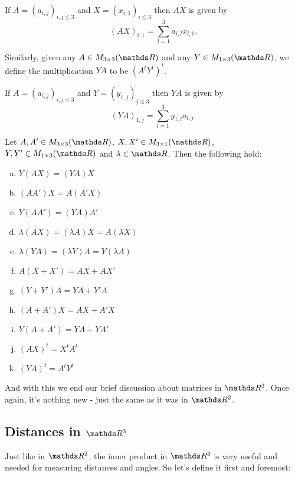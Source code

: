 \begin{lemma}
	If $A=(a_{i,j})_{i,j\leq 3}$ and $X=(x_{i,1})_{i\leq 3}$ then $AX$ is given by
	\[(AX)_{i,1}=\sum_{l=1}^3a_{i,l}x_{l,1}.\]
\end{lemma}

\begin{df}
	Similarly, given any $A\in M_{3\times 3}(\R)$ and any $Y\in M_{1\times 3}(\R)$, we define the multiplication $YA$ to be $(A^tY^t)^t$.
\end{df}

\begin{lemma}
	If $A=(a_{i,j})_{i,j\leq 3}$ and $Y=(y_{1,j})_{j\leq 3}$ then $YA$ is given by
\[(YA)_{1,j}=\sum_{l=1}^3y_{1,l}a_{l,j}.\]
\end{lemma}

\begin{prop}
	Let $A,A' \in M_{3\times 3}(\R)$, $X,X'\in M_{3\times 1}(\R)$, $Y,Y'\in M_{1\times 3}(\R)$ and $\lambda \in \R$. Then the following hold:
	\begin{multicols}{2}
		\begin{enumerate}[a)]
			\item $Y(AX)=(YA)X$
			\item $(AA')X=A(A'X)$
			\item $Y(AA')=(YA)A'$
			\item $\lambda(AX)=(\lambda A)X=A(\lambda X)$
			\item $\lambda(YA)=(\lambda Y)A=Y(\lambda A)$
			\item $A(X+X')=AX+AX'$
			\item $(Y+Y')A=YA+Y'A$
			\item $(A+A')X=AX+A'X$
			\item $Y(A+A')=YA+YA'$
			\item $(AX)^t=X^tA^t$
			\item $(YA)^t=A^tY^t$
		\end{enumerate}
	\end{multicols}
\end{prop}

And with this we end our brief discussion about matrices in $\R^3$. Once again, it's nothing new - just the same as it was in $\R^2$.

\newpage
\subsection{Distances in $\R^3$}

Just like in $\R^2$, the inner product in $\R^3$ is very useful and needed for measuring distances and angles. So let's define it first and foremost:

